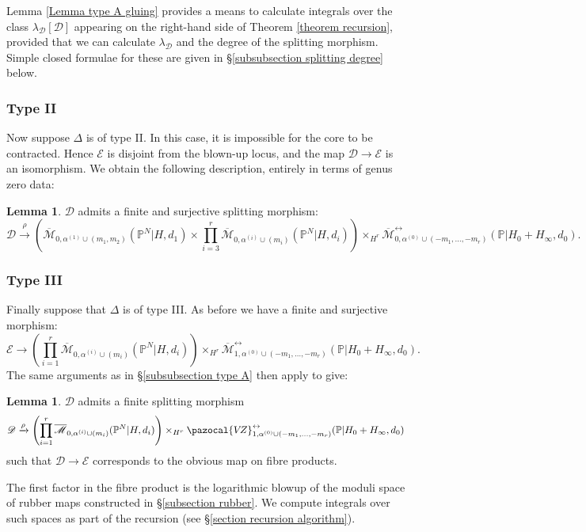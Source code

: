 \documentclass[11pt]{amsart}
\newcommand{\PP}{\mathbb P}
\newcommand{\VZ}{\pazocal{V\!Z}}
\renewcommand{\to}{\rightarrow}
\newcommand{\Mcal}{\mathcal{M}}
\newcommand{\Dcal}{\mathcal{D}}
\newcommand{\Ecal}{\mathcal{E}}
\newcommand{\ol}[1]{\overline{#1}}
\theoremstyle{definition}
\newtheorem{lemma}[thm]{Lemma}
\theoremstyle{definition}
\begin{document}
Lemma \ref{Lemma type A gluing} provides a means to calculate integrals over the class $\lambda_\Dcal[\Dcal]$ appearing on the right-hand side of Theorem \ref{theorem recursion}, provided that we can calculate $\lambda_\Dcal$ and the degree of the splitting morphism. Simple closed formulae for these are given in \S \ref{subsubsection splitting degree} below.

\subsubsection{Type II}
Now suppose $\Delta$ is of type II. In this case, it is impossible for the core to be contracted. Hence $\Ecal$ is disjoint from the blown-up locus, and the map $\Dcal \to \Ecal$ is an isomorphism. We obtain the following description, entirely in terms of genus zero data:
\begin{lemma} $\Dcal$ admits a finite and surjective splitting morphism:
\begin{equation*} \Dcal \xrightarrow{\rho} \left(\ol\Mcal_{0,\alpha^{(1)}\cup(m_1,m_2)}(\PP^N|H,d_1)\times\prod_{i=3}^r \ol\Mcal_{0,\alpha^{(i)}\cup(m_i)}(\PP^N|H,d_i)\right) \times_{H^r} \ol\Mcal^{\leftrightarrow}_{0,\alpha^{(0)}\cup(-m_1,\ldots,-m_r)}(\mathbb P|H_0+H_\infty,d_0).\end{equation*}\end{lemma}

\subsubsection{Type III} \label{subsubsection type C+} Finally suppose that $\Delta$ is of type III. As before we have a finite and surjective morphism:
\begin{equation*} \Ecal \to  \left( \prod_{i=1}^r \ol\Mcal_{0,\alpha^{(i)}\cup(m_i)}(\PP^N|H,d_i) \right) \times_{H^r} \ol\Mcal^{\leftrightarrow}_{1,\alpha^{(0)}\cup(-m_1,\ldots,-m_r)}(\mathbb{P}|H_0+H_\infty,d_0). \end{equation*}
The same arguments as in \S \ref{subsubsection type A} then apply to give:
\begin{lemma} $\Dcal$ admits a finite splitting morphism
\begin{equation*}\Dcal \xrightarrow{\rho} \left( \prod_{i=1}^r \ol\Mcal_{0,\alpha^{(i)}\cup(m_i)}(\PP^N|H,d_i) \right) \times_{H^r} \VZ^{\leftrightarrow}_{1,\alpha^{(0)}\cup(-m_1,\ldots,-m_r)}(\mathbb{P}|H_0+H_\infty,d_0)\end{equation*}
such that $\Dcal \to \Ecal$ corresponds to the obvious map on fibre products.\end{lemma}
The first factor in the fibre product is the logarithmic blowup of the moduli space of rubber maps constructed in \S \ref{subsection rubber}. We compute integrals over such spaces as part of the recursion (see \S \ref{section recursion algorithm}).
\end{document}
